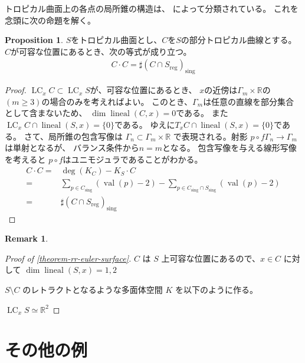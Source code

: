 \documentclass[a4paper,dvipdfmx,reqno,12pt]{amsart}
\theoremstyle{definition}
\newtheorem{proposition}[theorem]{Proposition}
\newtheorem{remark}[theorem]{Remark}
\newcommand{\opn}[1]{\operatorname{#1}}
\numberwithin{equation}{section}
\begin{document}
トロピカル曲面上の各点の局所錐の構造は、
\cite[Corollary 2.4]{shaw2015tropical}
によって分類されている。
これを念頭に次の命題を解く。
\begin{proposition}
$S$をトロピカル曲面とし、$C$を$S$の部分トロピカル曲線とする。
$C$が可容な位置にあるとき、次の等式が成り立つ。
\begin{align}
     C\cdot C=\sharp (C\cap S_{\mathrm{reg}})_{\mathrm{sing}}
\end{align}
\end{proposition}
\begin{proof}
$\opn{LC}_x C\subset \opn{LC}_x S$が、可容な位置にあるとき、
$x$の近傍は$\Gamma_m\times \mathbb{R}$の
$(m\geq 3)$の場合のみを考えればよい。
このとき、$\Gamma_m$は任意の直線を部分集合として含まないため、
$\dim \opn{lineal}(C,x)=0$である。
また$\opn{LC}_x C\cap \opn{lineal}(S,x)=\{0\}$である。
ゆえに$T_x C\cap \opn{lineal}(S,x)=\{0\}$である。
さて、局所錐の包含写像は
$\Gamma_{n}\subset \Gamma_m\times \mathbb{R}$
で表現される。射影 $p\circ f\Gamma_n\to \Gamma_m$は単射となるが、
バランス条件から$n=m$となる。
包含写像を与える線形写像を考えると
$p\circ f$はユニモジュラであることがわかる。
\begin{align}
C\cdot C=&\opn{deg}(K_C)-K_S\cdot C \\
=& \sum_{p\in C_{\mathrm{sing}}}(\opn{val}(p)-2)
- \sum_{p\in C_{\mathrm{sing}}\cap S_{\mathrm{sing}}}
(\opn{val}(p)-2) \\
=& \sharp (C\cap S_{\mathrm{reg}})_{\mathrm{sing}}
\end{align}

\end{proof}

\begin{remark}
     
\end{remark}

\begin{proof}[{Proof of \cref{theorem-rr-euler-surface}}]

$C$ は $S$ 上可容な位置にあるので、$x\in C$
に対して $\dim \opn{lineal}(S,x)=1,2$

$S\setminus C$ のレトラクトとなるような多面体空間
$K$ を以下のように作る。


$\opn{LC}_x S\simeq \mathbb{R}^{2}$

\end{proof}

\section{その他の例}
\end{document}
